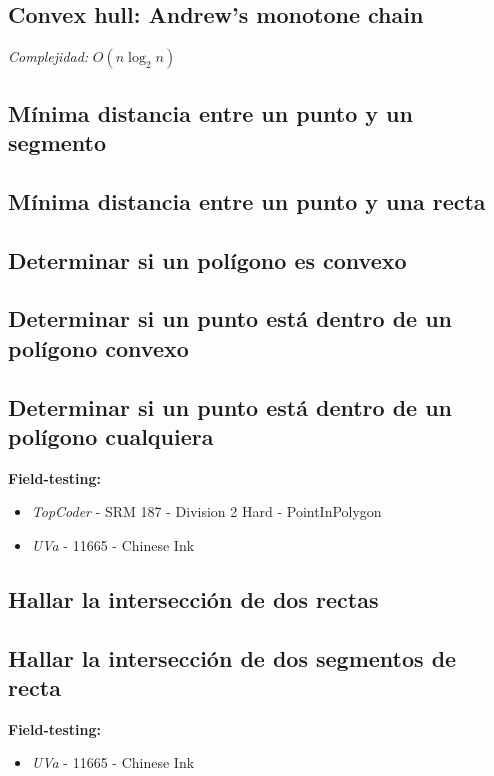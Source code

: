 \documentclass[10pt,letterpaper,twocolumn,twosided]{article}
\newcommand{\codigofuente}[1]{

\dotfill
}
\begin{document}
\subsection{Convex hull: Andrew's monotone chain}
\emph{Complejidad:} $ O(n \log_{2}{n}) $
\codigofuente{./src/geometria/monotonechain.cpp}

\subsection{Mínima distancia entre un punto y un segmento}
\codigofuente{./src/geometria/distance_point_to_segment.cpp}

\subsection{Mínima distancia entre un punto y una recta}
\codigofuente{./src/geometria/distance_point_to_line.cpp}

\subsection{Determinar si un polígono es convexo}
\codigofuente{./src/geometria/is_convex_polygon.cpp}

\subsection{Determinar si un punto está dentro de un polígono convexo}
\codigofuente{./src/geometria/is_inside_convex_polygon.cpp}

\subsection{Determinar si un punto está dentro de un polígono cualquiera}
\small
\textbf{Field-testing:}
\begin{itemize}
\item \emph{TopCoder} -  SRM 187 - Division 2 Hard - PointInPolygon
\item \emph{UVa} - 11665 - Chinese Ink
\end{itemize}
\normalsize
\codigofuente{./src/geometria/is_inside_concave_polygon.cpp}

\subsection{Hallar la intersección de dos rectas}
\codigofuente{./src/geometria/line_line_intersection.cpp}

\subsection{Hallar la intersección de dos segmentos de recta}
\label{hallar_interseccion_segmentos}
\small
\textbf{Field-testing:}
\begin{itemize}
\item \emph{UVa} - 11665 - Chinese Ink
\end{itemize}
\normalsize
\end{document}
